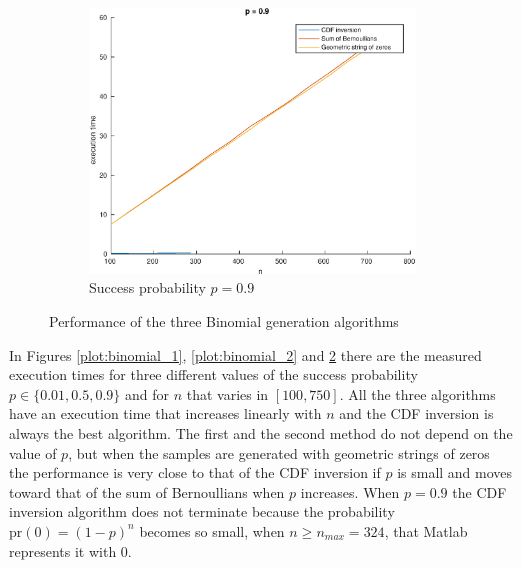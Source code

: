 \documentclass[a4paper,oneside]{article}
\begin{document}
\begin{figure}[htbp]
\begin{subfigure}{0.5\textwidth}
    \centering
    \includegraphics[width=0.95\textwidth]{binomial_gen_3}
    \caption{Success probability $p=0.9$}
    \label{plot:binomial_3}
  \end{subfigure}
  \caption{Performance of the three Binomial generation algorithms}
\end{figure}

In Figures \ref{plot:binomial_1}, \ref{plot:binomial_2} and
\ref{plot:binomial_3} there are the measured execution times for three
different values of the success probability $p \in \{ 0.01, 0.5, 0.9
\}$ and for $n$ that varies in $[100, 750]$. All the three algorithms
have an execution time that increases linearly with $n$ and the CDF
inversion is always the best algorithm. The first and the second
method do not depend on the value of $p$, but when the samples are
generated with geometric strings of zeros the performance is very close
to that of the CDF inversion if $p$ is small and moves toward that of
the sum of Bernoullians when $p$ increases. When $p=0.9$ the CDF
inversion algorithm does not terminate because the probability
$\mathrm{pr}(0) = (1-p)^n$ becomes so small, when $n \geq n_{max} =
324$, that Matlab represents it with 0.
\end{document}
